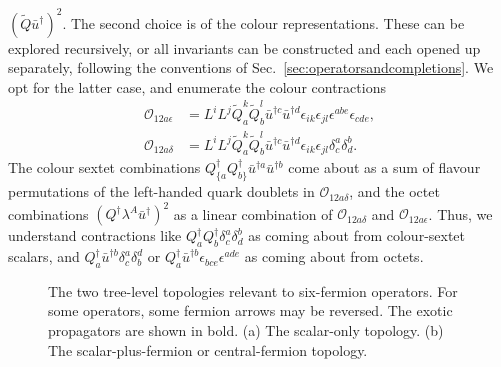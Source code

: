 $(\tilde{Q}\bar{u}^{\dagger})^{2}$. The second choice is of the colour
representations. These can be explored recursively, or all invariants can be
constructed and each opened up separately, following the conventions of
Sec.~\ref{sec:operatorsandcompletions}. We opt for the latter case, and
enumerate the colour contractions
\begin{subequations}
  \begin{align}
    \mathcal{O}_{12a\epsilon} &= L^{i} L^{j} \tilde{Q}^{k}_{a} \tilde{Q}^{l}_{b} \bar{u}^{\dagger c} \bar{u}^{\dagger d} \epsilon_{ik}\epsilon_{jl} \epsilon^{abe}\epsilon_{cde}, \\
    \mathcal{O}_{12a\delta} &= L^{i} L^{j} \tilde{Q}^{k}_{a} \tilde{Q}^{l}_{b} \bar{u}^{\dagger c} \bar{u}^{\dagger d} \epsilon_{ik}\epsilon_{jl} \delta_{c}^{a} \delta_{d}^{b}.
  \end{align}
\end{subequations}
The colour sextet combinations
$Q^{\dagger}_{\{a} Q^{\dagger}_{b\}} \bar{u}^{\dagger a} \bar{u}^{\dagger b}$
come about as a sum of flavour permutations of the left-handed quark doublets in
$\mathcal{O}_{12a\delta}$, and the octet combinations
$(Q^{\dagger} \lambda^{A} \bar{u}^{\dagger})^{2}$ as a linear combination of
$\mathcal{O}_{12a\delta}$ and $\mathcal{O}_{12a\epsilon}$. Thus, we understand
contractions like
$Q^{\dagger}_{a} Q^{\dagger}_{b} \delta^{a}_{c} \delta^{b}_{d}$ as coming about
from colour-sextet scalars, and
$Q^{\dagger}_{a} \bar{u}^{\dagger b} \delta^{a}_{c} \delta^{d}_{b}$ or
$Q^{\dagger}_{a} \bar{u}^{\dagger b} \epsilon_{bce}\epsilon^{ade}$ as coming
about from octets.

\begin{figure}[t]
  \centering
  \caption{The two tree-level topologies relevant to six-fermion operators. For
    some operators, some fermion arrows may be reversed. The exotic propagators
    are shown in bold. (a) The scalar-only topology. (b) The scalar-plus-fermion
    or central-fermion topology.}
  \label{fig:6f-topologies}
\end{figure}

